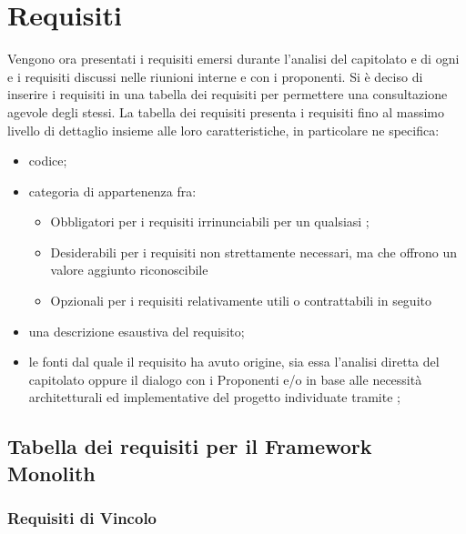 \section{Requisiti}
Vengono ora presentati i requisiti emersi durante l’analisi del capitolato e di ogni  e i requisiti discussi nelle riunioni interne e con i proponenti.
Si è deciso di inserire i requisiti in una tabella dei requisiti per permettere una consultazione agevole degli stessi.
La tabella dei requisiti presenta i requisiti fino al massimo livello di dettaglio insieme alle loro caratteristiche, in particolare ne specifica:
\begin{itemize}
	\item codice;
	\item categoria di appartenenza fra:
	\begin{itemize}
		\item Obbligatori per i requisiti irrinunciabili per un qualsiasi ;
		\item Desiderabili per i requisiti non strettamente necessari, ma che offrono un valore aggiunto riconoscibile
		\item Opzionali per i requisiti relativamente utili o contrattabili in seguito
	\end{itemize}
	\item una descrizione esaustiva del requisito;
	\item le fonti dal quale il requisito ha avuto origine, sia essa l’analisi diretta del capitolato oppure il dialogo con i Proponenti e/o in base alle necessità architetturali ed implementative del progetto individuate tramite ;	
\end{itemize}

\subsection{Tabella dei requisiti per il Framework Monolith}

\subsubsection{Requisiti di Vincolo}

